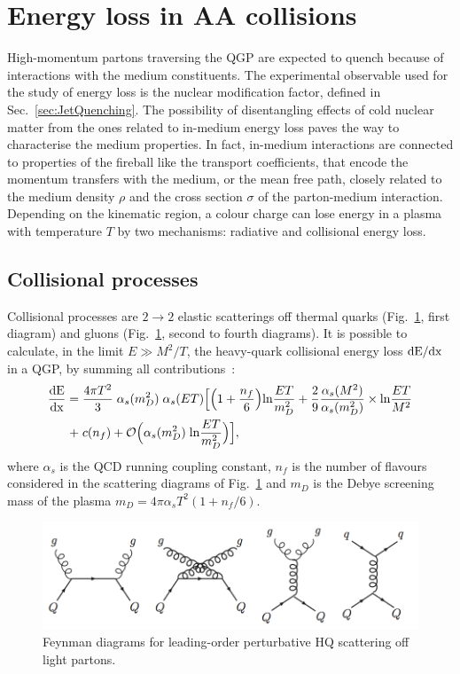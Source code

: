 \section{Energy loss in AA collisions}
High-momentum partons traversing the QGP are expected to quench because of interactions 
with the medium constituents. The experimental observable used for the study of energy loss is the 
nuclear modification factor, defined in Sec.~\ref{sec:JetQuenching}. The possibility of disentangling
effects of cold nuclear matter from the ones related to in-medium energy loss paves the way to characterise the 
medium properties. In fact, in-medium interactions are connected to properties of the fireball like the transport coefficients,
that encode the momentum transfers with the medium, or the mean free path, closely related to the medium density $\rho$
and the cross section $\sigma$ of the parton-medium interaction. Depending on the kinematic region, a colour charge 
can lose energy in a plasma with temperature $T$ by two mechanisms: radiative and collisional energy loss.
\subsection{Collisional processes}
Collisional processes are $2 \rightarrow 2$ elastic scatterings off thermal quarks (Fig.~\ref{fig:LoopCollScatt}, first diagram) and gluons (Fig.~\ref{fig:LoopCollScatt}, second to fourth diagrams). It is possible to calculate, in the limit $E \gg M^2/T$, the heavy-quark collisional energy loss $\rm d E/\rm d x$ in a QGP, by summing all contributions~\cite{Peigne:2008nd}:
\begin{equation}
\label{eq:QCDenLossColl}
\begin{split}
\frac{\rm d E}{\rm d x} = \; & \frac{4 \pi T^2}{3}\;  \alpha_s (m^2_D)\;  \alpha_s(ET) {\Big [} {\Big (}  1 + \frac{n_f}{6}{\Big )} {\rm ln} \frac{ET}{m^2_D} + \frac{2}{9} \frac{\alpha_s(M^2)}{\alpha_s(m^2_D)} \times {\rm ln} \frac{ET}{M^2}  \\+\;  &c(n_f) + \mathcal{O}{\Big (}\alpha_s (m^2_D) \; {\rm ln}\frac{ET}{m^2_D}{\Big )}{\Big ]},
\end{split}
\end{equation}
where $\alpha_s$ is the QCD running coupling constant, $n_f$ is the number of flavours 
considered in the scattering diagrams of Fig.~\ref{fig:LoopCollScatt} and $m_D$ is the 
Debye screening mass of the plasma $m_D = 4\pi \alpha_s T^2 (1 + n_f/6)$. 
\begin{figure}[!ht]
  \centering
  \includegraphics[width=14cm]{FigCap2/LO_HQscattering.png}
  \caption{Feynman diagrams for leading-order perturbative HQ scattering off light partons.}
  \label{fig:LoopCollScatt}
\end{figure}

